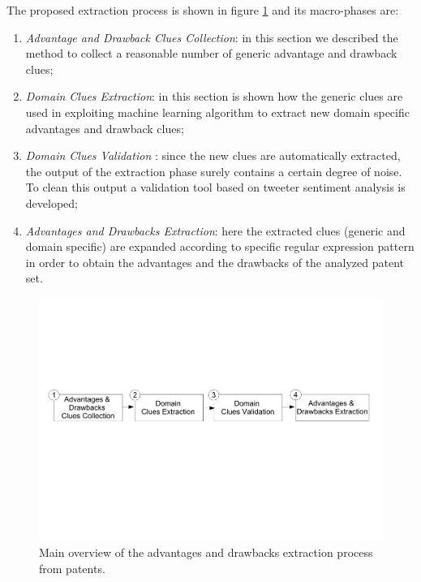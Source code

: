 \documentclass[]{book}
\providecommand{\tightlist}{%
  \setlength{\itemsep}{0pt}\setlength{\parskip}{0pt}}
\begin{document}
The proposed extraction process is shown in figure
\ref{fig:advdrwprocessgeneral} and its macro-phases are:

\begin{enumerate}
\def\labelenumi{\arabic{enumi}.}
\tightlist
\item
  \emph{Advantage and Drawback Clues Collection}: in this section we
  described the method to collect a reasonable number of generic
  advantage and drawback clues;
\item
  \emph{Domain Clues Extraction}: in this section is shown how the
  generic clues are used in exploiting machine learning algorithm to
  extract new domain specific advantages and drawback clues;
\item
  \emph{Domain Clues Validation} : since the new clues are automatically
  extracted, the output of the extraction phase surely contains a
  certain degree of noise. To clean this output a validation tool based
  on tweeter sentiment analysis is developed;
\item
  \emph{Advantages and Drawbacks Extraction}: here the extracted clues
  (generic and domain specific) are expanded according to specific
  regular expression pattern in order to obtain the advantages and the
  drawbacks of the analyzed patent set.
\end{enumerate}

\begin{figure}

{\centering \includegraphics[width=0.8\linewidth]{_bookdown_files/figures/General} 

}

\caption{Main overview of the advantages and drawbacks extraction process from patents.}\label{fig:advdrwprocessgeneral}
\end{figure}
\end{document}
